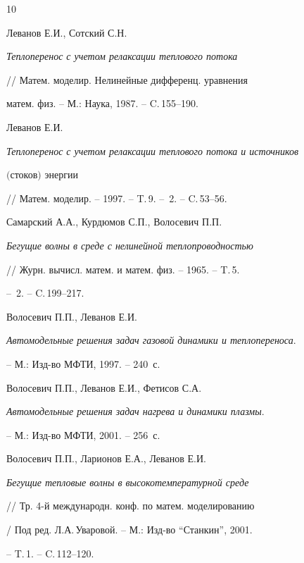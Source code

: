 \begin{thebibliography}{10}


Леванов Е.И., Сотский С.Н.


{\em Теплоперенос с учетом релаксации теплового потока}


// Матем. моделир. Нелинейные дифференц. уравнения


матем. физ. -- М.: Наука, 1987. -- C.\,155--190.





 Леванов Е.И.


{\em Теплоперенос с учетом релаксации теплового потока и источников


$($стоков$)$ энергии}


// Матем. моделир. -- 1997. -- T.\,9. -- \No\,2. -- C.\,53--56.







Самарский А.А., Курдюмов С.П., Волосевич П.П.


{\em Бегущие волны в среде с нелинейной теплопроводностью}


// Журн. вычисл. матем. и матем. физ. -- 1965. -- T.\,5.


-- \No\,2. -- C.\,199--217.







Волосевич П.П., Леванов Е.И.


{\em Автомодельные решения задач газовой динамики и теплопереноса}.


-- М.: Изд-во МФТИ, 1997. -- 240~с.







Волосевич П.П., Леванов Е.И., Фетисов С.А.


{\em Автомодельные решения задач нагрева и динамики плазмы}.


-- М.: Изд-во МФТИ, 2001. -- 256~с.







Волосевич П.П., Ларионов Е.А., Леванов Е.И.


{\em Бегущие тепловые волны в высокотемпературной среде}


// Тр. 4-й международн. конф. по матем. моделированию


/ Под ред. Л.А.\,Уваровой. -- М.: Изд-во ``Станкин'', 2001.


-- T.\,1. -- C.\,112--120.





\end{thebibliography}





\vskip 2cm












\label{end}





